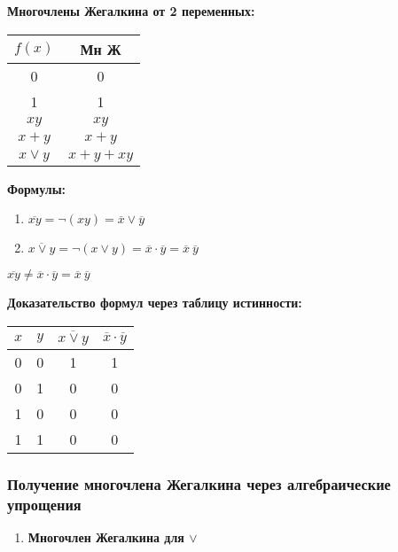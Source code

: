 \documentclass[russian]{lecture-notes}
\begin{document}
\begin{sloppypar}
\textbf{Многочлены Жегалкина от 2 переменных:}

\begin{table}[h!]
	\centering
	\begin{tabular}{|c|c|}
		\hline
		$f(x)$ & Мн Ж  \\ \hline
		0    		   & 0     \\ \hline
		1    		   & 1     \\ \hline
		$xy$          & $xy$     \\ \hline
		$x + y$ & $x + y$ \\ \hline
		$x \lor y$ & $x + y + xy$ \\ \hline
	\end{tabular}
\end{table}

\textbf{Формулы:}

\begin{enumerate}
	\item 	$\overline{xy} = \neg (xy) = \overline{x} \lor \overline{y} $
	\item $\overline{x \lor y} = \neg (x \lor y) = \overline{x} \cdot \overline{y} = \overline{x} \: \overline{y}$
\end{enumerate}

\begin{remark}
	$\overline{xy} \neq \overline{x} \cdot \overline{y} = \overline{x} \: \overline{y}$
\end{remark}

\textbf{Доказательство формул через таблицу истинности:}

\begin{table}[h!]
	\centering	
	\begin{tabular}{|c|c|c|c|}
		\hline
		$x$ & $y$ & $\overline{x \lor y}$ & $\overline{x} \cdot \overline{y}$ \\ \hline
		0 & 0 & 1   & 1   \\ \hline
		0 & 1 & 0   & 0   \\ \hline
		1 & 0 & 0   & 0   \\ \hline
		1 & 1 & 0   & 0   \\ \hline
\end{tabular}
\end{table}

\subsubsection{Получение многочлена Жегалкина через алгебраические упрощения}

\begin{enumerate}
	\item{
		\textbf{Многочлен Жегалкина для $\lor$}

}
\end{enumerate}
\end{sloppypar}
\end{document}
